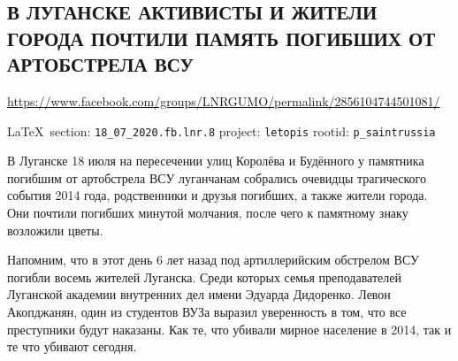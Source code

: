  
 
\subsection{В ЛУГАНСКЕ АКТИВИСТЫ И ЖИТЕЛИ ГОРОДА ПОЧТИЛИ ПАМЯТЬ ПОГИБШИХ ОТ АРТОБСТРЕЛА ВСУ}
\url{https://www.facebook.com/groups/LNRGUMO/permalink/2856104744501081/}
  
\vspace{0.5cm}
{\small\LaTeX~section: \verb|18_07_2020.fb.lnr.8| project: \verb|letopis| rootid: \verb|p_saintrussia|}
\vspace{0.5cm}

В Луганске 18 июля на пересечении улиц Королёва и Будённого у памятника
погибшим от артобстрела ВСУ луганчанам собрались очевидцы трагического события
2014 года, родственники и друзья погибших, а также жители города. Они почтили
погибших минутой молчания, после чего к памятному знаку возложили цветы.

Напомним, что в этот день 6 лет назад под артиллерийским обстрелом ВСУ погибли
восемь жителей Луганска. Среди которых семья преподавателей Луганской академии
внутренних дел имени Эдуарда Дидоренко. Левон Акопджанян, один из студентов
ВУЗа выразил уверенность в том, что все преступники будут наказаны. Как те, что
убивали мирное население в 2014, так и те что убивают сегодня.
  
